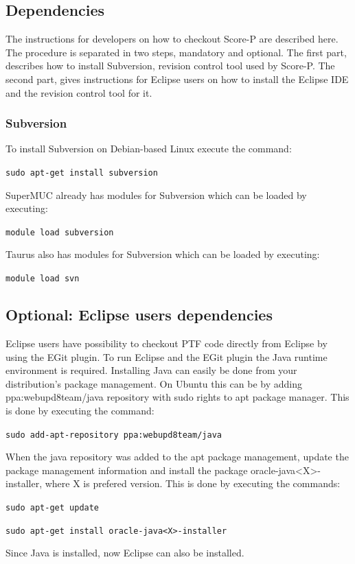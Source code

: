 \documentclass[11pt,a4paper, oneside]{book} %
\newcommand{\ptfbrackets}[1]{\textless #1\textgreater}
\begin{document}
\subsection{Dependencies}

The instructions for developers on how to checkout Score-P are described here.
The procedure is separated in two steps, mandatory and optional. The first part,
describes how to install Subversion, revision control tool used by Score-P. The
second part, gives instructions for Eclipse users on how to install the Eclipse
IDE and the revision control tool for it.

\subsubsection{Subversion}
To install Subversion on Debian-based Linux execute the command:

\texttt{sudo apt-get install subversion}

SuperMUC already has modules for Subversion which can be loaded by executing:

\texttt{module load subversion}

Taurus also has modules for Subversion which can be loaded by executing:

\texttt{module load svn}

\subsection{Optional: Eclipse users dependencies}
Eclipse users have possibility to checkout PTF code directly from Eclipse by
using the EGit plugin. To run Eclipse and the EGit plugin the Java runtime
environment is required. Installing Java can easily be done from your
distribution's package management. On Ubuntu this can be by adding
ppa:webupd8team/java repository with sudo rights to apt package manager. This is
done by executing the command:

\texttt{sudo add-apt-repository ppa:webupd8team/java}

When the java repository was added to the apt package management, update the
package management information and install the package
oracle-java\ptfbrackets{X}-installer, where X is prefered version.
This is done by executing the commands:

\texttt{sudo apt-get update}

\texttt{sudo apt-get install oracle-java\ptfbrackets{X}-installer}

Since Java is installed, now Eclipse can also be installed.
\end{document}
